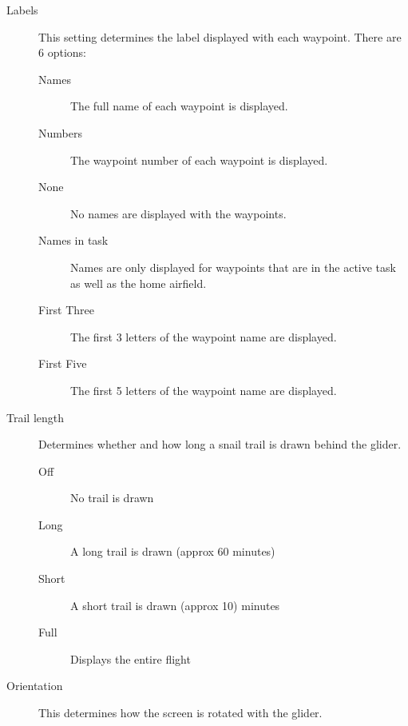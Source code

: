 \documentclass[a4paper,12pt]{refrep}
\begin{document}
\begin{description}
\item[Labels] This setting determines the label displayed with each waypoint. There are 6 options:

\begin{description}
\item[Names] The full name of each waypoint is displayed.
\item[Numbers] The waypoint number of each waypoint is displayed.
\item[None] No names are displayed with the waypoints.
\item[Names in task] Names are only displayed for waypoints that are in the active task as well as the home airfield.
\item[First Three] The first 3 letters of the waypoint name are displayed.
\item[First Five] The first 5 letters of the waypoint name are displayed.
\end{description}
\item[Trail length] Determines whether and how long a snail trail is drawn behind the glider.
\begin{description}
\item[Off] No trail is drawn
\item[Long] A long trail is drawn (approx 60 minutes)
\item[Short] A short trail is drawn (approx 10) minutes 
\item[Full] Displays the entire flight
\end{description}
\item[Orientation]  This determines how the screen is rotated with the glider.


\end{description}
\end{document}
